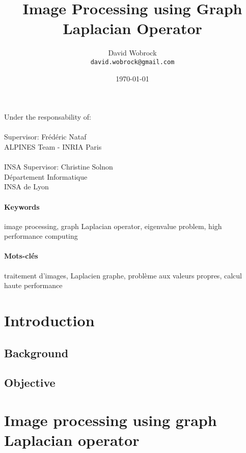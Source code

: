 \documentclass[]{article}
\title{Image Processing using Graph Laplacian Operator}
\author{David Wobrock \\ \texttt{david.wobrock@gmail.com}}
\date{\today}
\begin{document}
\maketitle

Under the responsability of:\\ \\
Supervisor: Frédéric Nataf\\
ALPINES Team - INRIA Paris\\ \\
INSA Supervisor: Christine Solnon\\
Département Informatique\\
INSA de Lyon

\begin{abstract}
 
\end{abstract}

\paragraph{Keywords}
image processing, graph Laplacian operator, eigenvalue problem, high performance computing

\begin{otherlanguage}{french}
  \begin{abstract}
   
  \end{abstract}
\end{otherlanguage}

\paragraph{Mots-clés}
traitement d'images, Laplacien graphe, problème aux valeurs propres, calcul haute performance

\section{Introduction}

\subsection{Background}


\subsection{Objective}


\section{Image processing using graph Laplacian operator}

\end{document}

